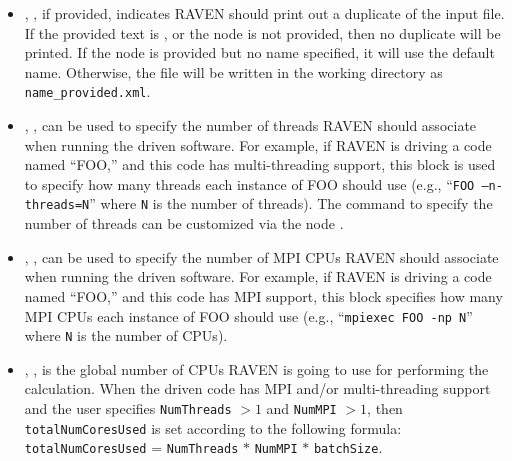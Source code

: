 \begin{itemize}
\item {}, , if provided, indicates RAVEN should print out a
  duplicate of the input file.  If the provided text is , or the node is not provided, then
  no duplicate will be printed.  If the node is provided but no name specified, it will use the default name.
  Otherwise, the file will be written in the working directory as \texttt{name\_provided.xml}.
%

\item {}, , can be used to
specify the number of threads RAVEN should associate when running the driven
software.
%
For example, if RAVEN is driving a code named ``FOO,'' and this code has
multi-threading support, this block is used to specify how many threads each
instance of FOO should use (e.g., ``\texttt{FOO --n-threads=N}'' where \texttt{N}
 is the number of threads). The command to specify the number of threads can be
customized via the node .
%

\item {}, , can be used to
specify the number of MPI CPUs RAVEN should associate when running the driven
software.
%
For example, if RAVEN is driving a code named ``FOO,'' and this code has MPI
support, this block specifies how many MPI CPUs each instance of FOO should use
(e.g., ``\texttt{mpiexec FOO -np N}'' where \texttt{N} is the number of CPUs).
%

\item {}, , is the
global number of CPUs RAVEN is going to use for performing the calculation.
%
When the driven code has MPI and/or multi-threading support and the user
specifies \texttt{NumThreads} $> 1$  and \texttt{NumMPI} $> 1$, then
\texttt{totalNumCoresUsed} is set according to the following formula:\\
\texttt{totalNumCoresUsed} = \texttt{NumThreads} $*$ \texttt{NumMPI} $*$
\texttt{batchSize}.
%


\end{itemize}
